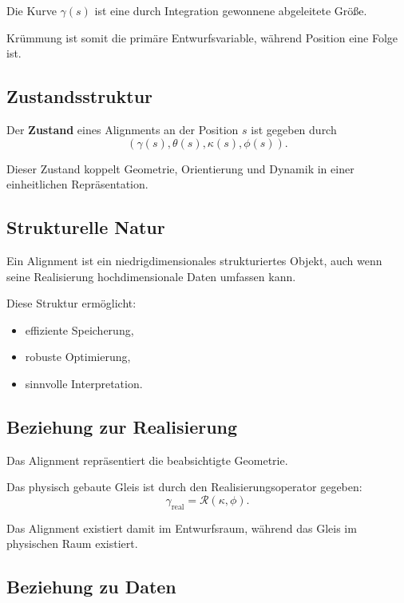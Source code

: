 Die Kurve \(\gamma(s)\) ist eine durch Integration gewonnene abgeleitete
Größe.

Krümmung ist somit die primäre Entwurfsvariable, während Position eine Folge
ist.

\subsection{Zustandsstruktur}

\begin{definition}
Der \textbf{Zustand} eines Alignments an der Position \(s\) ist gegeben durch
\[
(\gamma(s), \theta(s), \kappa(s), \phi(s)).
\]
\end{definition}

Dieser Zustand koppelt Geometrie, Orientierung und Dynamik in einer
einheitlichen Repräsentation.

\subsection{Strukturelle Natur}

\begin{proposition}
Ein Alignment ist ein niedrigdimensionales strukturiertes Objekt, auch wenn
seine Realisierung hochdimensionale Daten umfassen kann.
\end{proposition}

Diese Struktur ermöglicht:
\begin{itemize}
\item effiziente Speicherung,
\item robuste Optimierung,
\item sinnvolle Interpretation.
\end{itemize}

\subsection{Beziehung zur Realisierung}

Das Alignment repräsentiert die beabsichtigte Geometrie.

Das physisch gebaute Gleis ist durch den Realisierungsoperator gegeben:
\[
\gamma_{\mathrm{real}} = \mathcal{R}(\kappa, \phi).
\]

Das Alignment existiert damit im Entwurfsraum, während das Gleis im
physischen Raum existiert.

\subsection{Beziehung zu Daten}

